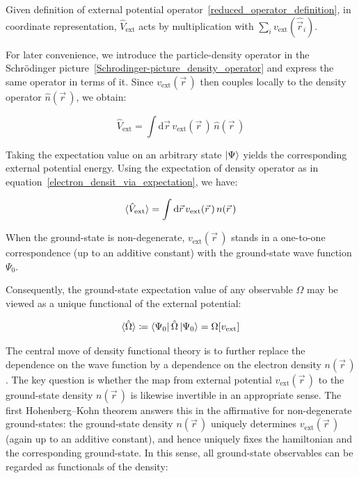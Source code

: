 Given definition of external potential operator~\eqref{reduced_operator_definition}, in coordinate representation, $\hat{V}_\mathrm{ext}$ acts by multiplication with $\sum_i v_\mathrm{ext}(\hat{\vec{r}}_i)$. 

For later convenience, we introduce the particle-density operator in the Schrödinger picture~\eqref{Schrodinger-picture_density_operator} and express the same operator in terms of it.
Since $v_\mathrm{ext}(\vec{r}\,)$ then couples locally to the density operator $\hat{n}(\vec{r}\,)$, we obtain:

\begin{equation}
    \hat{V}_\mathrm{ext}=\int\mathrm{d}\vec{r}\,v_\mathrm{ext}(\vec{r}\,)\,\hat{n}(\vec{r}\,)
\label{local_external_potential_operator_definition}
\end{equation}

Taking the expectation value on an arbitrary state $\ket{\Psi}$ yields the corresponding external potential energy. Using the expectation of density operator as in
equation~\eqref{electron_densit_via_expectation}, we have:

\begin{equation}
    \braket{\hat{V}_\mathrm{ext}}=\int\mathrm{d}\vec{r}\,v_\mathrm{ext}(\vec{r}\,)\,n(\vec{r}\,)
\label{external_potential_energy_expectation}
\end{equation}

When the ground-state is non-degenerate, $v_\mathrm{ext}(\vec{r}\,)$ stands in a one-to-one correspondence (up to an additive constant) with the ground-state wave function $\Psi_0$.

Consequently, the ground-state expectation value of any observable $\hat{\Omega}$ may be viewed as a unique functional of the external potential:

\begin{equation}
   \braket{\hat{\Omega}}\coloneqq \bra{\Psi_0}\hat{\Omega}\ket{\Psi_0}=\Omega[v_\mathrm{ext}]
\label{functional_from_external_potential}
\end{equation}

The central move of density functional theory is to further replace the dependence on the wave function by a dependence on the electron density $n(\vec{r}\,)$.
The key question is whether the map from external potential $v_\mathrm{ext}(\vec{r}\,)$ to the ground-state density $n(\vec{r}\,)$ is likewise invertible in an appropriate sense.
The first Hohenberg--Kohn theorem answers this in the affirmative for non-degenerate ground-states: the ground-state density $n(\vec{r}\,)$ uniquely determines $v_\mathrm{ext}(\vec{r}\,)$ (again up to an additive constant), and hence uniquely fixes the hamiltonian and the corresponding ground-state.
In this sense, all ground-state observables can be regarded as functionals of the density:

